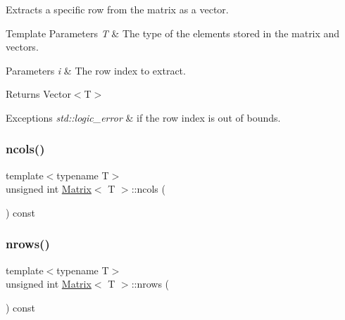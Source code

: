 Extracts a specific row from the matrix as a vector. 


\begin{DoxyTemplParams}{Template Parameters}
{\em T} & The type of the elements stored in the matrix and vectors. \\
\hline
\end{DoxyTemplParams}

\begin{DoxyParams}{Parameters}
{\em i} & The row index to extract. \\
\hline
\end{DoxyParams}
\begin{DoxyReturn}{Returns}
Vector$<$\+T$>$
\end{DoxyReturn}

\begin{DoxyExceptions}{Exceptions}
{\em std\+::logic\+\_\+error} & if the row index is out of bounds. \\
\hline
\end{DoxyExceptions}
\mbox{\label{classMatrix_aa62107f075998f969b39fcb1bef20c44}} 
\subsubsection{\texorpdfstring{ncols()}{ncols()}}
{\footnotesize\ttfamily template$<$typename T$>$ \\
unsigned int \mbox{\hyperlink{classMatrix}{Matrix}}$<$ T $>$\+::ncols (\begin{DoxyParamCaption}{ }\end{DoxyParamCaption}) const\hspace{0.3cm}{\ttfamily [inline]}}

\mbox{\label{classMatrix_ad025820349fa69f73f2da395af627741}} 
\subsubsection{\texorpdfstring{nrows()}{nrows()}}
{\footnotesize\ttfamily template$<$typename T$>$ \\
unsigned int \mbox{\hyperlink{classMatrix}{Matrix}}$<$ T $>$\+::nrows (\begin{DoxyParamCaption}{ }\end{DoxyParamCaption}) const\hspace{0.3cm}{\ttfamily [inline]}}

